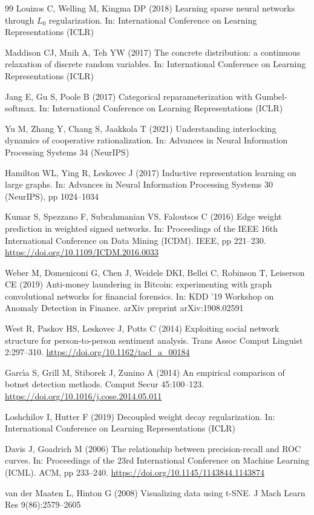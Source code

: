 \documentclass[pdflatex,sn-basic]{sn-jnl}
\theoremstyle{definition}
\theoremstyle{plain}
\begin{document}
\begin{thebibliography}{99}
Louizos C, Welling M, Kingma DP (2018) Learning sparse neural networks through $L_0$ regularization. In: International Conference on Learning Representations (ICLR)

Maddison CJ, Mnih A, Teh YW (2017) The concrete distribution: a continuous relaxation of discrete random variables. In: International Conference on Learning Representations (ICLR)

Jang E, Gu S, Poole B (2017) Categorical reparameterization with Gumbel-softmax. In: International Conference on Learning Representations (ICLR)

Yu M, Zhang Y, Chang S, Jaakkola T (2021) Understanding interlocking dynamics of cooperative rationalization. In: Advances in Neural Information Processing Systems 34 (NeurIPS)

Hamilton WL, Ying R, Leskovec J (2017) Inductive representation learning on large graphs. In: Advances in Neural Information Processing Systems 30 (NeurIPS), pp 1024--1034

Kumar S, Spezzano F, Subrahmanian VS, Faloutsos C (2016) Edge weight prediction in weighted signed networks. In: Proceedings of the IEEE 16th International Conference on Data Mining (ICDM). IEEE, pp 221--230. \url{https://doi.org/10.1109/ICDM.2016.0033}

Weber M, Domeniconi G, Chen J, Weidele DKI, Bellei C, Robinson T, Leiserson CE (2019) Anti-money laundering in Bitcoin: experimenting with graph convolutional networks for financial forensics. In: KDD '19 Workshop on Anomaly Detection in Finance. arXiv preprint arXiv:1908.02591

West R, Paskov HS, Leskovec J, Potts C (2014) Exploiting social network structure for person-to-person sentiment analysis. Trans Assoc Comput Linguist 2:297--310. \url{https://doi.org/10.1162/tacl_a_00184}

Garc{\'\i}a S, Grill M, Stiborek J, Zunino A (2014) An empirical comparison of botnet detection methods. Comput Secur 45:100--123. \url{https://doi.org/10.1016/j.cose.2014.05.011}

Loshchilov I, Hutter F (2019) Decoupled weight decay regularization. In: International Conference on Learning Representations (ICLR)

Davis J, Goadrich M (2006) The relationship between precision-recall and ROC curves. In: Proceedings of the 23rd International Conference on Machine Learning (ICML). ACM, pp 233--240. \url{https://doi.org/10.1145/1143844.1143874}

van der Maaten L, Hinton G (2008) Visualizing data using t-SNE. J Mach Learn Res 9(86):2579--2605

\end{thebibliography}
\end{document}
